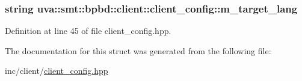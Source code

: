\subsubsection[{m\+\_\+target\+\_\+lang}]{\setlength{\rightskip}{0pt plus 5cm}string uva\+::smt\+::bpbd\+::client\+::client\+\_\+config\+::m\+\_\+target\+\_\+lang}\label{structuva_1_1smt_1_1bpbd_1_1client_1_1client__config_ae891e88473325f5fced94549f79878cf}


Definition at line 45 of file client\+\_\+config.\+hpp.



The documentation for this struct was generated from the following file\+:\begin{DoxyCompactItemize}
\item 
inc/client/\hyperlink{client__config_8hpp}{client\+\_\+config.\+hpp}\end{DoxyCompactItemize}
